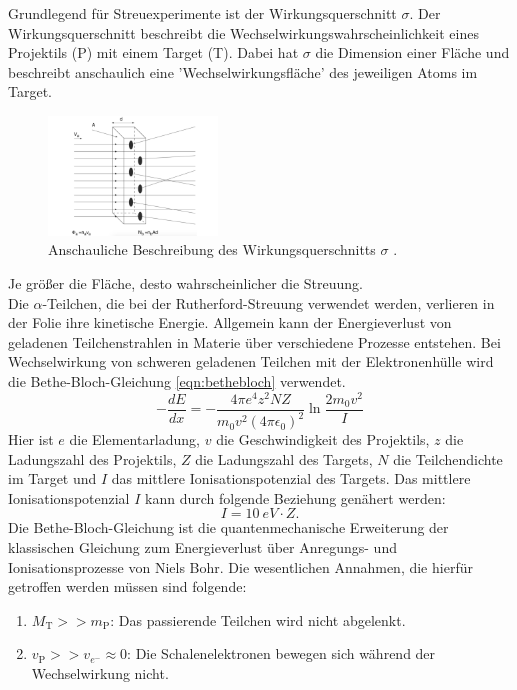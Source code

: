 Grundlegend für Streuexperimente ist der Wirkungsquerschnitt $\sigma$.
Der Wirkungsquerschnitt beschreibt die Wechselwirkungswahrscheinlichkeit eines Projektils (P) mit einem Target (T).
Dabei hat $\sigma$ die Dimension einer Fläche und beschreibt anschaulich eine 'Wechselwirkungsfläche' des jeweiligen Atoms im Target.
\begin{figure}[h!]
  \centering
  \includegraphics[width=0.4\textwidth]{images/wq.pdf}
  \caption{Anschauliche Beschreibung des Wirkungsquerschnitts $\sigma$ \cite{povh}.}
  \label{fig:wq}
\end{figure}
Je größer die Fläche, desto wahrscheinlicher die Streuung.
%
\\Die $\alpha$-Teilchen, die bei der Rutherford-Streuung verwendet werden, verlieren in der Folie ihre kinetische Energie.
Allgemein kann der Energieverlust von geladenen Teilchenstrahlen in Materie über verschiedene Prozesse entstehen.
Bei Wechselwirkung von schweren geladenen Teilchen mit der Elektronenhülle wird die Bethe-Bloch-Gleichung \eqref{eqn:bethebloch} verwendet.
\begin{equation}
	- \frac{d E}{d x} = - \frac{4 \pi e^4 z^2 N Z}{m_0 v^2 (4 \pi \epsilon_0)^2} \ln{\frac{2 m_0 v^2}{I}}
	\label{eqn:bethebloch}
\end{equation}
Hier ist $e$ die Elementarladung, $v$ die Geschwindigkeit des Projektils, $z$ die Ladungszahl des Projektils, $Z$ die Ladungszahl des Targets, $N$ die Teilchendichte im Target und $I$ das mittlere Ionisationspotenzial des Targets.
Das mittlere Ionisationspotenzial $I$ kann durch folgende Beziehung genähert werden:
\begin{equation*}
	I= \SI{10}{eV} \cdot Z.
\end{equation*}
Die Bethe-Bloch-Gleichung ist die quantenmechanische Erweiterung der klassischen Gleichung zum Energieverlust über Anregungs- und Ionisationsprozesse von Niels Bohr.
Die wesentlichen Annahmen, die hierfür getroffen werden müssen sind folgende:
\begin{enumerate}
	\item $M_{\text{T}} >> m_{\text{P}}$: Das passierende Teilchen wird nicht abgelenkt.
	\item $v_{\text{P}} >> v_{e^-} \approx 0$: Die Schalenelektronen bewegen sich während der Wechselwirkung nicht.
\end{enumerate}
